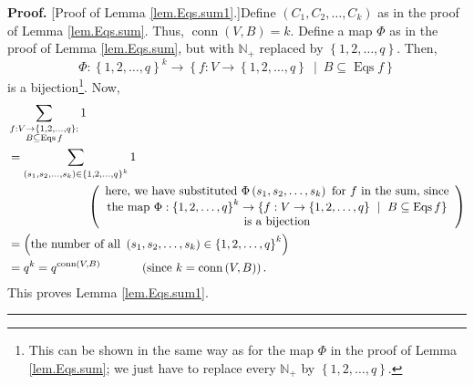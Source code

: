 \documentclass[numbers=enddot,12pt,final,onecolumn,notitlepage]{scrartcl}%
\theoremstyle{definition}
\newenvironment{proof}[1][Proof]{\noindent\textbf{#1.} }{\ \rule{0.5em}{0.5em}}
\newenvironment{vershort}{}{}
\let\sumnonlimits\sum
\renewcommand{\sum}{\sumnonlimits\limits}
\begin{document}
\begin{vershort}
\begin{proof}
[Proof of Lemma \ref{lem.Eqs.sum1}.]Define $\left(  C_{1},C_{2},\ldots
,C_{k}\right)  $ as in the proof of Lemma \ref{lem.Eqs.sum}. Thus,
$\operatorname*{conn}\left(  V,B\right)  =k$. Define a map $\Phi$ as in the
proof of Lemma \ref{lem.Eqs.sum}, but with $\mathbb{N}_{+}$ replaced by
$\left\{  1,2,\ldots,q\right\}  $. Then,
\[
\Phi:\left\{  1,2,\ldots,q\right\}  ^{k}\rightarrow\left\{  f:V\rightarrow
\left\{  1,2,\ldots,q\right\}  \ \mid\ B\subseteq\operatorname*{Eqs}f\right\}
\]
is a bijection\footnote{This can be shown in the same way as for the map
$\Phi$ in the proof of Lemma \ref{lem.Eqs.sum}; we just have to replace every
$\mathbb{N}_{+}$ by $\left\{  1,2,\ldots,q\right\}  $.}. Now,%
\begin{align*}
&  \sum_{\substack{f:V\rightarrow\left\{  1,2,\ldots,q\right\}  ;\\B\subseteq
\operatorname*{Eqs}f}}1\\
&  =\sum_{\left(  s_{1},s_{2},\ldots,s_{k}\right)  \in\left\{  1,2,\ldots
,q\right\}  ^{k}}1\\
&  \ \ \ \ \ \ \ \ \ \ \ \ \ \ \ \ \ \ \ \ \left(
\begin{array}
[c]{c}%
\text{here, we have substituted }\Phi\left(  s_{1},s_{2},\ldots,s_{k}\right)
\text{ for }f\text{ in the sum, since}\\
\text{the map }\Phi:\left\{  1,2,\ldots,q\right\}  ^{k}\rightarrow\left\{
f:V\rightarrow\left\{  1,2,\ldots,q\right\}  \ \mid\ B\subseteq
\operatorname*{Eqs}f\right\} \\
\text{is a bijection}%
\end{array}
\right) \\
&  =\left(  \text{the number of all }\left(  s_{1},s_{2},\ldots,s_{k}\right)
\in\left\{  1,2,\ldots,q\right\}  ^{k}\right) \\
&  =q^{k}=q^{\operatorname*{conn}\left(  V,B\right)  }%
\ \ \ \ \ \ \ \ \ \ \left(  \text{since }k=\operatorname*{conn}\left(
V,B\right)  \right)  .
\end{align*}
This proves Lemma \ref{lem.Eqs.sum1}.
\end{proof}
\end{vershort}
\end{document}
